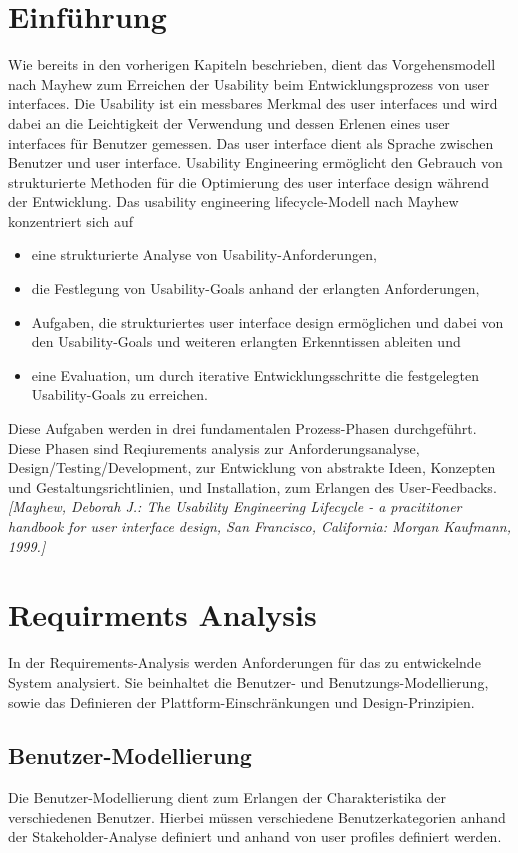 \documentclass[a4paper,11pt]{article}%
\renewcommand{\\}{\vspace*{0.5\baselineskip} \newline}
\begin{document}
\section{Einführung}
	Wie bereits in den vorherigen Kapiteln beschrieben, dient das Vorgehensmodell nach Mayhew zum Erreichen der Usability beim Entwicklungsprozess von user interfaces. Die Usability ist ein messbares Merkmal des user interfaces und wird dabei an die Leichtigkeit der Verwendung und dessen Erlenen eines user interfaces für Benutzer gemessen. Das user interface dient als Sprache zwischen Benutzer und user interface. Usability Engineering ermöglicht den Gebrauch von strukturierte Methoden für die Optimierung des user interface design während der Entwicklung. Das usability engineering lifecycle-Modell nach Mayhew konzentriert sich auf 
	\begin{itemize}
		\item eine strukturierte Analyse von Usability-Anforderungen,
		\item die Festlegung von Usability-Goals anhand der erlangten Anforderungen,
		\item Aufgaben, die strukturiertes user interface design ermöglichen und dabei von den Usability-Goals und weiteren erlangten Erkenntissen ableiten und
		\item eine Evaluation, um durch iterative Entwicklungsschritte die festgelegten Usability-Goals zu erreichen.
	\end{itemize}
	Diese Aufgaben werden in drei fundamentalen Prozess-Phasen durchgeführt. Diese Phasen sind Reqiurements analysis zur Anforderungsanalyse, Design/Testing/Development, zur Entwicklung von abstrakte Ideen, Konzepten und Gestaltungsrichtlinien, und Installation, zum Erlangen des User-Feedbacks. \emph{[Mayhew, Deborah J.:	The Usability Engineering Lifecycle - a pracititoner handbook for user interface design, San Francisco, California: Morgan Kaufmann, 1999.]}
\newpage
\section{Requirments Analysis}
	In der Requirements-Analysis werden Anforderungen für das zu entwickelnde System analysiert. Sie beinhaltet die Benutzer- und Benutzungs-Modellierung, sowie das Definieren der Plattform-Einschränkungen und Design-Prinzipien. 
\subsection{Benutzer-Modellierung}
	Die Benutzer-Modellierung dient zum Erlangen der Charakteristika der verschiedenen Benutzer. Hierbei müssen verschiedene Benutzerkategorien anhand der Stakeholder-Analyse definiert und anhand von user profiles definiert werden.
\end{document}
